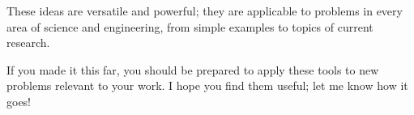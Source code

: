 \documentclass[12pt]{book}
\begin{document}
These ideas are versatile and powerful; they are applicable to
problems in every area of science and engineering, from simple
examples to topics of current research.

If you made it this far, you should be prepared to apply these
tools to new problems relevant to your work.  I hope you find
them useful; let me know how it goes!













\printindex
\end{document}

